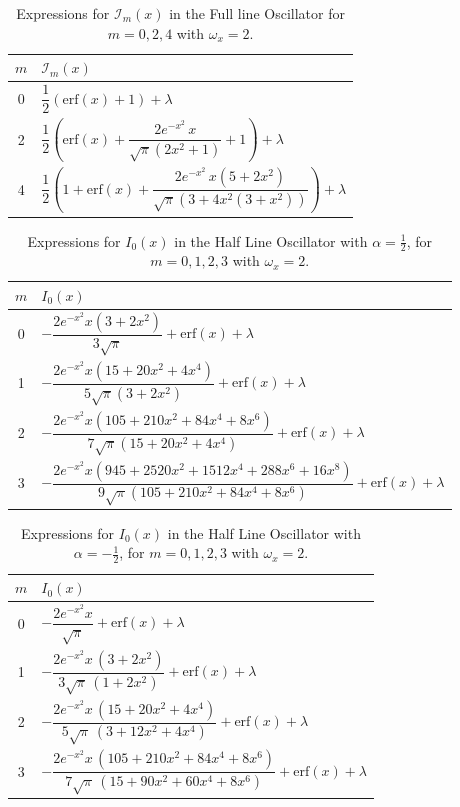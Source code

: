 \documentclass[12pt]{article}
\begin{document}
\begin{table}[h!]
\centering
\setlength{\tabcolsep}{1em}
\renewcommand{\arraystretch}{1.5}
\begin{tabular}{c|l}
\hline
$m$ & $\mathcal{I}_m(x)$ \\ \hline
0 & $\dfrac{1}{2}\left(\mathrm{erf}(x)+1\right) + \lambda$ \\ 
2 & $\dfrac{1}{2}\left(\mathrm{erf}(x) + \dfrac{2 e^{-x^2}\,x}{\sqrt{\pi}(2x^2+1)} + 1\right) + \lambda$ \\ 
4 & $\dfrac{1}{2}\left(1 + \mathrm{erf}(x) + \dfrac{2 e^{-x^2}\,x(5+2x^2)}{\sqrt{\pi}(3+4x^2(3+x^2))}\right) + \lambda$ \\ \hline
\end{tabular}
\caption{Expressions for $\mathcal{I}_m(x)$ in the Full line Oscillator for $m=0,2,4$ with $\omega_x=2$.}
\label{tab:Im-values}
\end{table}


\begin{table}[h!]
\centering
\setlength{\tabcolsep}{1em}
\renewcommand{\arraystretch}{1.6}
\begin{tabular}{c|l}
\hline
$m$ & $I_0(x)$ \\ \hline
0 & $-\dfrac{2 e^{-x^2}x(3+2x^2)}{3\sqrt{\pi}} + \mathrm{erf}(x) + \lambda$ \\[0.8em]
1 & $-\dfrac{2 e^{-x^2}x(15+20x^2+4x^4)}{5\sqrt{\pi}(3+2x^2)} + \mathrm{erf}(x) + \lambda$ \\[0.8em]
2 & $-\dfrac{2 e^{-x^2}x(105+210x^2+84x^4+8x^6)}{7\sqrt{\pi}(15+20x^2+4x^4)} + \mathrm{erf}(x) + \lambda$ \\[0.8em]
3 & $-\dfrac{2 e^{-x^2}x(945+2520x^2+1512x^4+288x^6+16x^8)}{9\sqrt{\pi}(105+210x^2+84x^4+8x^6)} + \mathrm{erf}(x) + \lambda$ \\ \hline
\end{tabular}
\caption{Expressions for $I_0(x)$ in the Half Line Oscillator with $\alpha=\tfrac{1}{2}$, for $m=0,1,2,3$ with $\omega_x=2$.}
\label{tab:I0-halfline}
\end{table}



\begin{table}[h!]
\centering
\setlength{\tabcolsep}{1em}
\renewcommand{\arraystretch}{1.6}
\begin{tabular}{c|l}
\hline
$m$ & $I_0(x)$ \\ \hline
0 & $-\dfrac{2 e^{-x^2}x}{\sqrt{\pi}} + \mathrm{erf}(x) + \lambda$ \\[0.8em]

1 & $-\dfrac{2 e^{-x^2}x \,(3+2x^2)}{3\sqrt{\pi}\,(1+2x^2)} + \mathrm{erf}(x) + \lambda$ \\[0.8em]

2 & $-\dfrac{2 e^{-x^2}x \,(15+20x^2+4x^4)}{5\sqrt{\pi}\,(3+12x^2+4x^4)} + \mathrm{erf}(x) + \lambda$ \\[0.8em]

3 & $-\dfrac{2 e^{-x^2}x \,(105+210x^2+84x^4+8x^6)}{7\sqrt{\pi}\,(15+90x^2+60x^4+8x^6)} + \mathrm{erf}(x) + \lambda$ \\ \hline
\end{tabular}
\caption{Expressions for $I_0(x)$ in the Half Line Oscillator with $\alpha=-\tfrac{1}{2}$, for $m=0,1,2,3$ with $\omega_x=2$.}
\label{tab:I0-halfline-neg}
\end{table}
\end{document}
